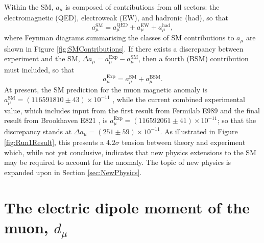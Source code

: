 Within the SM, $a_{\mu}$ is composed of contributions from all sectors: the electromagnetic (QED), electroweak (EW), and hadronic (had), so that 
%
\begin{equation}
  a_{\mu}^{\text{SM}} = a_{\mu}^{\text{QED}} + a_{\mu}^{\text{EW}} + a_{\mu}^{\text{had}}, %
  \label{eqn:SMContributions}
\end{equation}
%
where Feynman diagrams summarising the classes of SM contributions to $a_{\mu}$ are shown in Figure \ref{fig:SMContributions}. If there exists a discrepancy between experiment and the SM, $\Delta a_{\mu} = a_{\mu}^{\text{Exp}} - a_{\mu}^{\text{SM}}$, then a fourth (BSM) contribution must included, so that 
%
\begin{equation}
  a_{\mu}^{\text{Exp}} = a_{\mu}^{\text{SM}} + a_{\mu}^{\text{BSM}}. %
  \label{eqn:AllContributions}
\end{equation}
%
At present, the SM prediction for the muon magnetic anomaly is $a_{\mu}^{\text{SM}}=(116591810\pm43)\times10^{-11}$ \cite{aMuSM}, while the current combined experimental value, which includes input from the first result from Fermilab E989 \cite{SummaryRun1} and the final result from Brookhaven E821 \cite{BNLFinalReport}, is $a_{\mu}^{\text{Exp}}=(116592061\pm41)\times10^{-11}$; so that the discrepancy stands at $\Delta a_{\mu} =(251\pm59)\times10^{-11}$. As illustrated in Figure \ref{fig:Run1Result}, this presents a $4.2\sigma$ tension between theory and experiment which, while not yet conclusive, indicates that new physics extensions to the SM may be required to account for the anomaly. The topic of new physics is expanded upon in Section \ref{sec:NewPhysics}.%
%

\section{The electric dipole moment of the muon, $d_{\mu}$} \label{sec:TheEDM}

